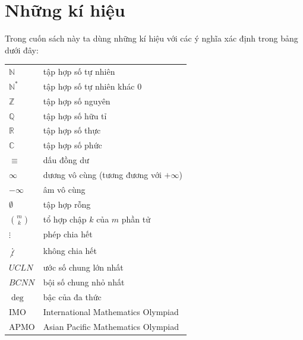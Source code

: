 
\chapter*{Những kí hiệu}

Trong cuốn sách này ta dùng những kí hiệu với các ý nghĩa xác định trong bảng dưới đây:

\begin{center}
\begin{tabular}{ l  l }
$\mathbb N$ & tập hợp số tự nhiên\\
$\mathbb N^*$ & tập hợp số tự nhiên khác $0$\\
$\mathbb Z$ & tập hợp số nguyên\\
$\mathbb Q$ & tập hợp số hữu tỉ\\
$\mathbb R$ & tập hợp số thực\\
$\mathbb C$ & tập hợp số phức\\
$\equiv$& dấu đồng dư\\
$\infty$& dương vô cùng (tương đương với $+\infty$)\\
$-\infty$& âm vô cùng\\
$\emptyset$& tập hợp rỗng\\
$\binom{m}{k}$ & tổ hợp chập $k$ của $m$ phần tử\\
$\vdots$& phép chia hết\\
$\not\vdots\;\;$& không chia hết\\
$UCLN$& ước số chung lớn nhất\\
$BCNN$& bội số chung nhỏ nhất\\
$\deg$& bậc của đa thức\\
IMO&International Mathematics Olympiad \\
APMO&Asian Pacific Mathematics Olympiad\\
\end{tabular}
\end{center}
